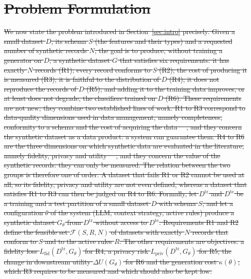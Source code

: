\documentclass[conference]{IEEEtran}
\providecommand{\DIFdeltex}[1]{{\protect\color{red}\sout{#1}}}                      %
\providecommand{\DIFdel}[1]{\texorpdfstring{\DIFdeltex{#1}}{}} %
\begin{document}
\section{\DIFdel{Problem Formulation}}
\addtocounter{section}{-1}%
\DIFdel{We now state the problem introduced in Section~\ref{sec:intro} precisely. Given a small dataset $D$, its schema $S$ (the features and their types) and a requested number of synthetic records $N$, the goal is to produce, without training a generator on $D$, a synthetic dataset $G$ that satisfies six requirements: it has exactly $N$ records (R1); every record conforms to $S$ (R2); the cost of producing it is measured (R3); it is faithful to the distribution of $D$ (R4); it does not reproduce the records of $D$ (R5); and adding it to the training data improves, or at least does not degrade, the classifiers trained on $D$ (R6). These requirements are not new; they combine two established lines of work. R1 to R3 correspond to data-quality dimensions used in data management, namely completeness, conformity to a schema and the cost of acquiring the data~\mbox{%
\cite{wang1996beyond,batini2009methodologies}}\hskip0pt%
, and they concern the synthetic dataset as a data product: a system can guarantee them. R4 to R6 are the three dimensions on which synthetic data are evaluated in the literature, namely fidelity, privacy and utility~\mbox{%
\cite{qian2023synthcity,lautrup2025syntheval}}\hskip0pt%
, and they concern the value of the synthetic records: they can only be measured. The relation between the two groups is therefore one of order. A dataset that fails R1 or R2 cannot be used at all, so its fidelity, privacy and utility are not even defined, whereas a dataset that satisfies R1 to R3 can then be judged on R4 to R6. Formally, let $D^{\mathrm{tr}}$ and $D^{\mathrm{te}}$ be a training and a test partition of a small dataset $D$ with schema $S$, and let a configuration $\theta$ of the system (LLM, context strategy, active rules) produce a synthetic dataset $G_\theta$ from $D^{\mathrm{tr}}$ without access to $D^{\mathrm{te}}$. Requirements R1 and R2 define the feasible set $\mathcal{F}(S,R,N)$ of datasets with exactly $N$ records that conform to $S$ and to the active rules $R$. The other requirements are objectives: a fidelity loss $L_{\mathrm{fid}}(D^{\mathrm{tr}},G_\theta)$ for R4, a privacy risk $L_{\mathrm{priv}}(D^{\mathrm{tr}},G_\theta)$ for R5, the change in downstream utility $\Delta U(G_\theta)$ for R6 and the generation cost $\kappa(\theta)$, which R3 requires to be measured and which should also be kept low:
}%
\end{document}
